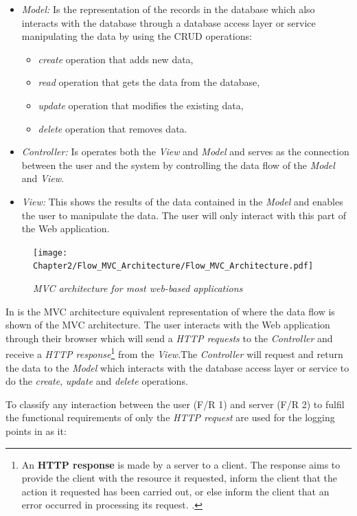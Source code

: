 \begin{itemize}
	\item \textit{Model:} Is the representation of the records in the database which also interacts with the database through a database access layer or service manipulating the data by using the CRUD operations:
	\begin{itemize}
		\item \textit{create} operation that adds new data,
		\item \textit{read} operation that gets the data from the database,
		\item \textit{update} operation that modifies the existing data,
		\item \textit{delete} operation that removes data.
	\end{itemize}
	\item \textit{Controller:} Is operates both the \textit{View} and \textit{Model} and serves as the connection between the user and the system by controlling the data flow of the \textit{Model} and
	\textit{View}.
	\item \textit{View:} This shows the results of the data contained in the \textit{Model} and enables the user to manipulate the data. The user will only interact with this part of the Web application.
\end{itemize}

\begin{figure}[!htb]
	\centering %
	\texttt{[image: Chapter2/Flow\_MVC\_Architecture/Flow\_MVC\_Architecture.pdf]}
	\caption[MVC architecture for most web-based applications]
	{\textit{MVC architecture for most web-based applications \cite{Gu2010}}}\label{fig:ch2_flowMVC_Architecture}
\end{figure}

In  is the MVC architecture equivalent representation of  where the data flow is shown of the MVC architecture. The user interacts with the Web application through their browser which will send a \textit{HTTP requests} to the \textit{Controller} and receive a \textit{HTTP response}\footnote{An \textbf{HTTP response} is made by a server to a client. The response aims to provide the client with the resource it requested, inform the client that the action it requested has been carried out, or else inform the client that an error occurred in processing its request. \cite{IBM2021a}.} from the \textit{View}.The \textit{Controller} will request and return the data to the \textit{Model} which interacts with the database access layer or service to do the \textit{create}, \textit{update} and \textit{delete} operations.\par To classify any interaction between the user (F/R 1) and server (F/R 2) to fulfil the functional requirements of  only the \textit{HTTP request} are used for the logging points in  as it:

